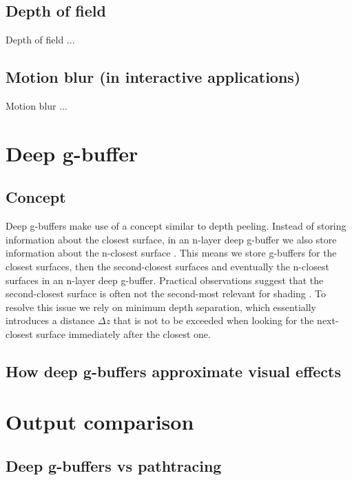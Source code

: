 \documentclass{ACGSeminar}
\begin{document}
	\subsection{Depth of field}
		Depth of field ...

	\subsection{Motion blur (in interactive applications)}
		Motion blur ...

\section{Deep g-buffer}
	\subsection{Concept}
		Deep g-buffers make use of a concept similar to depth peeling. Instead of storing information about the closest surface, in an n-layer deep g-buffer we also store information about the n-closest surface \cite{NDGB}. This means we store g-buffers for the closest surfaces, then the second-closest surfaces and eventually the n-closest surfaces in an n-layer deep g-buffer. Practical observations suggest that the second-closest surface is often not the second-most relevant for shading \cite{NDGB}. To resolve this issue we rely on minimum depth separation, which essentially introduces a distance $\Delta z$ that is not to be exceeded when looking for the next-closest surface immediately after the closest one.
	\subsection{How deep g-buffers approximate visual effects}


\section{Output comparison}
	\subsection{Deep g-buffers vs pathtracing}

\printbibliography
\end{document}
